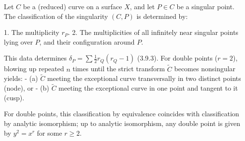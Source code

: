 Let $C$ be a (reduced) curve on a surface $X$, and let $P \in C$ be a singular point. The classification of the singularity $(C,P)$ is determined by:

1. The multiplicity $r_P$.
2. The multiplicities of all infinitely near singular points lying over $P$, and their configuration around $P$.

This data determines $\delta_P = \sum \frac{1}{2} r_Q(r_Q - 1)$ (3.9.3). For double points ($r = 2$), blowing up repeated $n$ times until the strict transform $\tilde{C}$ becomes nonsingular yields:
- (a) $\tilde{C}$ meeting the exceptional curve transversally in two distinct points (node), or
- (b) $\tilde{C}$ meeting the exceptional curve in one point and tangent to it (cusp).

For double points, this classification by equivalence coincides with classification by analytic isomorphism; up to analytic isomorphism, any double point is given by $y^2 = x^r$ for some $r \geqslant 2$.
